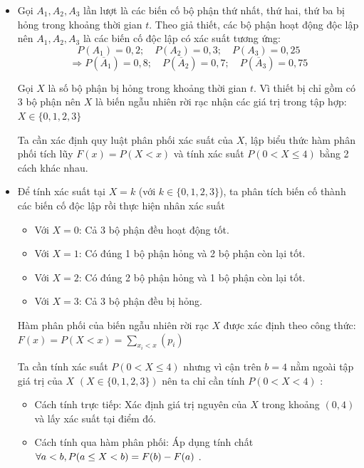 \documentclass[12pt]{article}
\begin{document}
\begin{itemize}
    \item Gọi $A_1, A_2, A_3$ lần lượt là các biến cố bộ phận thứ nhất, thứ hai, thứ ba bị hỏng trong khoảng thời gian $t$. Theo giả thiết, các bộ phận hoạt động độc lập nên $A_1, A_2, A_3$ là các biến cố độc lập có xác suất tương ứng:
    \[ P(A_1) = 0,2; \quad P(A_2) = 0,3; \quad P(A_3) = 0,25 \]
    \[\Rightarrow P(\overline{A}_1) = 0,8; \quad P(\overline{A}_2) = 0,7; \quad P(\overline{A}_3) = 0,75 \]
    
    Gọi $X$ là số bộ phận bị hỏng trong khoảng thời gian $t$. Vì thiết bị chỉ gồm có 3 bộ phận nên $X$ là biến ngẫu nhiên rời rạc nhận các giá trị trong tập hợp: $X \in \{0, 1, 2, 3\}$
    
   Ta cần xác định quy luật phân phối xác suất của $X$, lập biểu thức hàm phân phối tích lũy $F(x) = P(X < x)$ và tính xác suất $\displaystyle P(0 < X \le 4)$ bằng 2 cách khác nhau.

    \item Để tính xác suất tại $X = k$ (với $k \in \{0, 1, 2, 3\}$), ta phân tích biến cố thành các biến cố độc lập rồi thực hiện nhân xác suất
    \begin{itemize}
        \item Với $X = 0$: Cả 3 bộ phận đều hoạt động tốt.
        \item Với $X = 1$: Có đúng 1 bộ phận hỏng và 2 bộ phận còn lại tốt.
        \item Với $X = 2$: Có đúng 2 bộ phận hỏng và 1 bộ phận còn lại tốt.
        \item Với $X = 3$: Cả 3 bộ phận đều bị hỏng.
    \end{itemize}
    
    Hàm phân phối của biến ngẫu nhiên rời rạc $X$ được xác định theo công thức: \\ $\displaystyle F(x) = P(X < x) = \sum_{x_i < x} (p_i)$
    
    Ta cần tính xác suất $P(0 < X \le 4)$ nhưng vì cận trên $b=4$ nằm ngoài tập giá trị của $X$ $(X \in \{0, 1, 2, 3\})$ nên ta chỉ cần tính $P(0 < X < 4)$ :
    \begin{itemize}
        \item Cách tính trực tiếp: Xác định giá trị nguyên của $X$ trong khoảng $(0, 4)$ và lấy xác suất tại điểm đó.
        \item Cách tính qua hàm phân phối: Áp dụng tính chất $ \forall a < b, \\P(a \le X < b) = F(b) - F(a)$ .
    \end{itemize}
    


\end{itemize}
\end{document}
